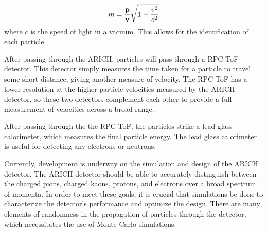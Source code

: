 \begin{equation}
    \label{eq:relMass}
    m = \frac{\bf{p}}{\bf{v}}\sqrt{1-\frac{v^2}{c^2}}
\end{equation}
where $c$ is the speed of light in a vacuum. This allows for the identification of each particle.

After passing through the \ac{ARICH}, particles will pass through a \ac{RPC ToF} detector. This detector simply measures the time taken for a particle to travel some short distance, giving another measure of velocity. The \ac{RPC ToF} has a lower resolution at the higher particle velocities measured by the \ac{ARICH} detector, so these two detectors complement each other to provide a full measurement of velocities across a broad range.

After passing through the the \ac{RPC ToF}, the particles strike a lead glass calorimeter, which measures the final particle energy. The lead glass calorimeter is useful for detecting any electrons or neutrons.

Currently, development is underway on the simulation and design of the \ac{ARICH} detector. The \ac{ARICH} detector should be able to accurately distinguish between the charged pions, charged kaons, protons, and electrons over a broad spectrum of momenta. In order to meet these goals, it is crucial that simulations be done to characterize the detector's performance and optimize the design. There are many elements of randomness in the propagation of particles through the detector, which necessitates the use of Monte Carlo simulations. 




\endinput

Any text after an \endinput is ignored.
You could put scraps here or things in progress.
